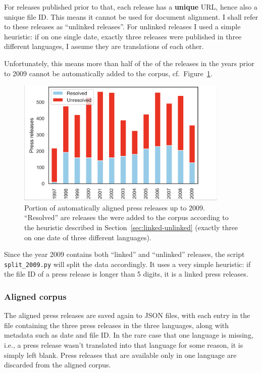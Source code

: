 For releases published prior to that, each release has a \textbf{unique} URL, hence also a unique file ID. 
This means it cannot be used for document alignment. 
I shall refer to these releases as \enquote{unlinked releases}.
For unlinked releases I used a simple heuristic: if on one single date, exactly three releases were published in three different languages, I assume they are translations of each other. 

Unfortunately, this means more than half of the of the releases in the years prior to 2009 cannot be automatically added to the corpus, cf.~Figure~\ref{fig:linked-unlinked}.

\begin{figure}[h]
	\centering
	\includegraphics[width=0.9\textwidth]{graphics/linked-unlinked.png}
	\caption[Portion of automatically aligned press releases]{Portion of automatically aligned press releases up to 2009. 
	\enquote{Resolved} are releases the were added to the corpus according to the heuristic described in Section~\ref{sec:linked-unlinked} (exactly three on one date of three different languages).}
	\label{fig:linked-unlinked}
\end{figure}

Since the year 2009 contains both \enquote{linked} and \enquote{unlinked} releases, the script \texttt{split\_2009.py} will split the data accordingly. 
It uses a very simple heuristic: if the file ID of a press release is longer than 5 digits, it is a linked press releases.

\subsubsection{Aligned corpus}
The aligned press releases are saved again to \acrshort{JSON} files, with each entry in the file containing the three press releases in the three languages, along with metadata such as date and file ID. 
In the rare case that one language is missing, i.e., a press release wasn't translated into that language for some reason, it is simply left blank. 
Press releases that are available only in one language are discarded from the aligned corpus.


